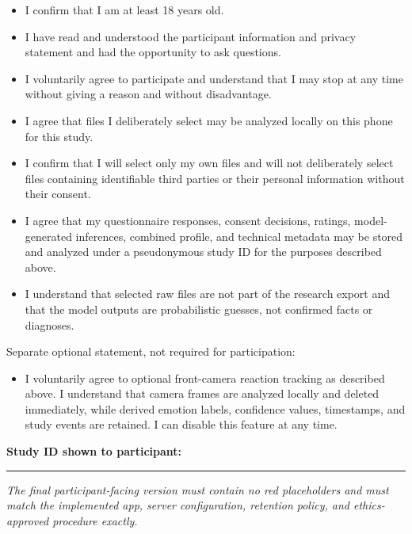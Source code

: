 \documentclass[10pt,a4paper]{article}
\begin{document}
\begin{itemize}[label=$\square$]
  \item I confirm that I am at least 18 years old.
  \item I have read and understood the participant information and privacy statement and had the opportunity to ask questions.
  \item I voluntarily agree to participate and understand that I may stop at any time without giving a reason and without disadvantage.
  \item I agree that files I deliberately select may be analyzed locally on this phone for this study.
  \item I confirm that I will select only my own files and will not deliberately select files containing identifiable third parties or their personal information without their consent.
  \item I agree that my questionnaire responses, consent decisions, ratings, model-generated inferences, combined profile, and technical metadata may be stored and analyzed under a pseudonymous study ID for the purposes described above.
  \item I understand that selected raw files are not part of the research export and that the model outputs are probabilistic guesses, not confirmed facts or diagnoses.
\end{itemize}

Separate optional statement, not required for participation:

\begin{itemize}[label=$\square$]
  \item I voluntarily agree to optional front-camera reaction tracking as described above. I understand that camera frames are analyzed locally and deleted immediately, while derived emotion labels, confidence values, timestamps, and study events are retained. I can disable this feature at any time.
\end{itemize}

\textbf{Study ID shown to participant:} \rule{0.38\textwidth}{0.4pt}

\vfill
\textit{The final participant-facing version must contain no red placeholders and must match the implemented app, server configuration, retention policy, and ethics-approved procedure exactly.}
\end{document}
